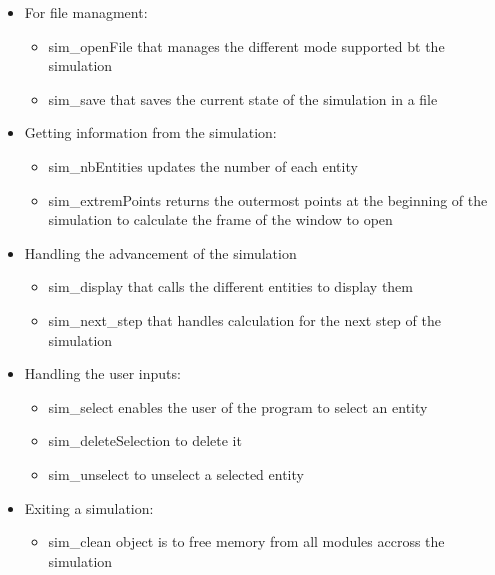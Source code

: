\documentclass[a4paper]{article} %
\begin{document}
\begin{multicols*}{2}
\begin{itemize}
\item For file managment:
    \begin{itemize}
    \item sim\_openFile that manages the different mode supported bt the simulation
    \item sim\_save that saves the current state of the simulation in a file
    \end{itemize}
\item Getting information from the simulation:
    \begin{itemize}
    \item sim\_nbEntities updates the number of each entity
    \item sim\_extremPoints returns the outermost points at the beginning of the simulation to calculate the frame of the window to open
    \end{itemize}
\item Handling the advancement of the simulation
    \begin{itemize}
    \item sim\_display that calls the different entities to display them
    \item sim\_next\_step that handles calculation for the next step of the simulation
    \end{itemize}
\item Handling the user inputs:
    \begin{itemize}
    \item sim\_select enables the user of the program to select an entity
    \item sim\_deleteSelection to delete it
    \item sim\_unselect to unselect a selected entity
    \end{itemize}
\item Exiting a simulation:
    \begin{itemize}
    \item sim\_clean object is to free memory from all modules accross the simulation
    \end{itemize}
\end{itemize}



\label{lastpage}
\end{multicols*}
\end{document}
